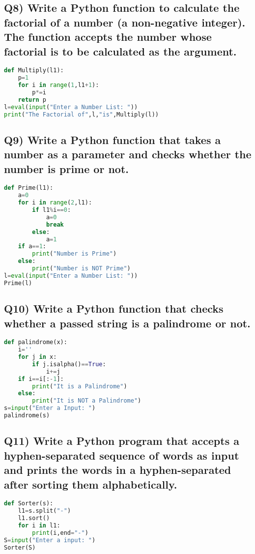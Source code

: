 \documentclass{article}
\begin{document}
\subsection*{Q8) Write a Python function to calculate the factorial of a number (a non-negative integer). The function accepts the number whose factorial is to be calculated as the argument.}
\begin{lstlisting}[language=Python]
def Multiply(l1):
    p=1
    for i in range(1,l1+1):
        p*=i
    return p
l=eval(input("Enter a Number List: "))
print("The Factorial of",l,"is",Multiply(l))
\end{lstlisting}

\subsection*{Q9) Write a Python function that takes a number as a parameter and checks whether the number is prime or not.}
\begin{lstlisting}[language=Python]
def Prime(l1):
    a=0
    for i in range(2,l1):
        if l1%i==0:
            a=0
            break
        else:
            a=1
    if a==1:
        print("Number is Prime")
    else:
        print("Number is NOT Prime")
l=eval(input("Enter a Number List: "))
Prime(l)
\end{lstlisting}

\subsection*{Q10) Write a Python function that checks whether a passed string is a palindrome or not.}
\begin{lstlisting}[language=Python]
def palindrome(x):
    i=''
    for j in x:
        if j.isalpha()==True:
            i+=j
    if i==i[:-1]:
        print("It is a Palindrome")
    else:
        print("It is NOT a Palindrome")
s=input("Enter a Input: ")
palindrome(s)
\end{lstlisting}

\subsection*{Q11) Write a Python program that accepts a hyphen-separated sequence of words as input and prints the words in a hyphen-separated after sorting them alphabetically.}
\begin{lstlisting}[language=Python]
def Sorter(s):
    l1=s.split("-")
    l1.sort()
    for i in l1:
        print(i,end="-")
S=input("Enter a input: ")
Sorter(S)
\end{lstlisting}
\end{document}

